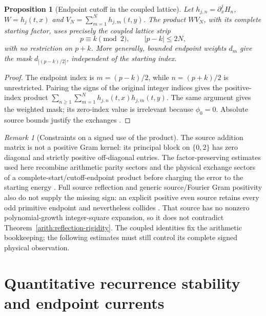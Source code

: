 \documentclass[11pt]{article}
\numberwithin{equation}{section}
\newtheorem{proposition}[theorem]{Proposition}
\theoremstyle{definition}
\theoremstyle{remark}
\newtheorem{remark}[theorem]{Remark}
\begin{document}
\begin{proposition}[Endpoint cutoff in the coupled lattice]
\label{core:complete-start-strip}
Let $h_{j,n}=\partial_x^jH_n$, $W=h_j(t,x)$ and
$V_N=\sum_{m=1}^Nh_{j,m}(t,y)$.  The product $WV_N$, with its complete
starting factor, uses precisely the coupled lattice strip
\begin{equation}
 p\equiv k\pmod2,\qquad |p-k|\le2N,
 \label{core:endpoint-strip}
\end{equation}
with no restriction on $p+k$.  More generally, bounded endpoint weights
$d_m$ give the mask $d_{|(p-k)/2|}$, independent of the starting index.
\end{proposition}
\begin{proof}
The endpoint index is $m=(p-k)/2$, while
$n=(p+k)/2$ is unrestricted.  Pairing the signs of the original integer
indices gives the positive-index product
$\sum_{n\ge1}\sum_{m=1}^Nh_{j,n}(t,x)h_{j,m}(t,y)$.
The same argument gives the weighted mask; its zero-index value is
irrelevant because $\phi_0=0$.  Absolute source bounds justify the
exchanges \cite{ThetaParityStrip}.
\end{proof}

\begin{remark}[Constraints on a signed use of the product]
\label{core:coupled-scope}
The source addition matrix is not a positive Gram kernel: its principal
block on $\{0,2\}$ has zero diagonal and strictly positive off-diagonal
entries.  The factor-preserving estimates used here recombine arithmetic parity
sectors and the physical exchange sectors of a complete-start/cutoff-endpoint
product before charging the error to the starting energy
\cite{ThetaCoupled,ThetaParityStrip,ThetaReflectedControl}.
Full source reflection and generic source/Fourier Gram positivity
also do not supply the missing sign: an explicit positive even source
retains every odd primitive endpoint and nevertheless collides
\cite{ThetaReflectedControl}.  That source has no nonzero
polynomial-growth integer-square expansion, so it does not contradict
Theorem~\ref{arith:reflection-rigidity}.  The coupled identities fix
the arithmetic bookkeeping; the following estimates must still control
its complete signed physical observation.
\end{remark}

\section{Quantitative recurrence stability and endpoint currents}
\label{adj:section}
\end{document}

